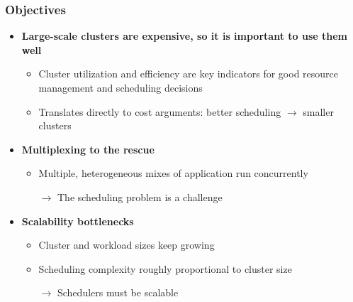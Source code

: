 \begin{frame}\frametitle{Objectives}
\begin{itemize}
	\item {\bf Large-scale clusters are expensive, so it is important to use them well}
	\begin{itemize}
		\item Cluster utilization and efficiency are key indicators for good resource management and scheduling decisions
		\item Translates directly to cost arguments: better scheduling $\to$ smaller clusters
	\end{itemize}

\vspace{10pt}

	\item {\bf Multiplexing to the rescue}
	\begin{itemize}
		\item Multiple, heterogeneous mixes of application run concurrently
		\item[$\to$] The scheduling problem is a challenge
	\end{itemize}

\vspace{10pt}

	\item {\bf Scalability bottlenecks}
	\begin{itemize}
		\item Cluster and workload sizes keep growing
		\item Scheduling complexity roughly proportional to cluster size
		\item[$\to$] Schedulers must be scalable
	\end{itemize}
\end{itemize}
\end{frame}

